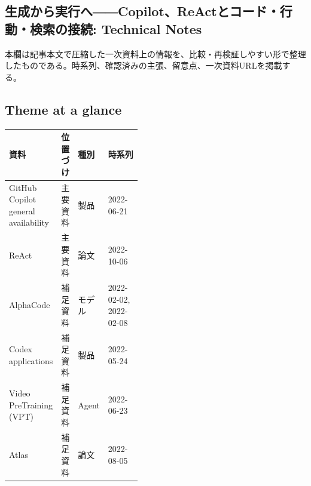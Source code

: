 \subsection*{生成から実行へ――Copilot、ReActとコード・行動・検索の接続: Technical Notes}
本欄は記事本文で圧縮した一次資料上の情報を、比較・再検証しやすい形で整理したものである。時系列、確認済みの主張、留意点、一次資料URLを掲載する。
\smallskip
{}\par
\medskip
\subsection*{Theme at a glance}
\begin{center}
\footnotesize
\begin{tabularx}{\linewidth}{@{}p{0.20\linewidth}p{0.10\linewidth}p{0.14\linewidth}X@{}}
\toprule
資料 & 位置づけ & 種別 & 時系列 \\
\midrule
GitHub Copilot general availability & 主要資料 & 製品 & 2022-06-21 \\
ReAct & 主要資料 & 論文 & 2022-10-06 \\
AlphaCode & 補足資料 & モデル & 2022-02-02, 2022-02-08 \\
Codex applications & 補足資料 & 製品 & 2022-05-24 \\
Video PreTraining (VPT) & 補足資料 & Agent & 2022-06-23 \\
Atlas & 補足資料 & 論文 & 2022-08-05 \\
\bottomrule
\end{tabularx}
\end{center}
\normalsize

